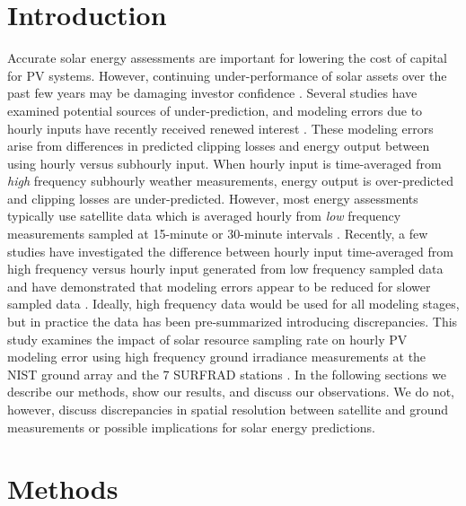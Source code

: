\documentclass[conference]{IEEEtran}
\begin{document}
\section{Introduction}
Accurate solar energy assessments are important for lowering the cost of capital for PV systems. However, continuing under-performance of solar assets over the past few years may be damaging investor confidence \cite{Matsui2021}. Several studies have examined potential sources of under-prediction, and modeling errors due to hourly inputs have recently received renewed interest \cite{Parikh2021,Anderson2020,Bradford2020,Kharait2020,Cormode2019}. These modeling errors arise from differences in predicted clipping losses and energy output between using hourly versus subhourly input. When hourly input is time-averaged from \emph{high} frequency subhourly weather measurements, energy output is over-predicted and clipping losses are under-predicted. However, most energy assessments typically use satellite data which is averaged hourly from \emph{low} frequency measurements sampled at 15-minute or 30-minute intervals \cite{Wilcox2012,Sengupta2018}. Recently, a few studies have investigated the difference between hourly input time-averaged from high frequency versus hourly input generated from low frequency sampled data and have demonstrated that modeling errors appear to be reduced for slower sampled data \cite{Bowersox2021,osti_1797569}. Ideally, high frequency data would be used for all modeling stages, but in practice the data has been pre-summarized introducing discrepancies. This study examines the impact of solar resource sampling rate on hourly PV modeling error using high frequency ground irradiance measurements at the NIST ground array \cite{Boyd2017,Boyd2017a,Boyd2017b} and the 7 SURFRAD stations \cite{Augustine2000}. In the following sections we describe our methods, show our results, and discuss our observations. We do not, however, discuss discrepancies in spatial resolution between satellite and ground measurements or possible implications for solar energy predictions.

\section{Methods}
\end{document}
